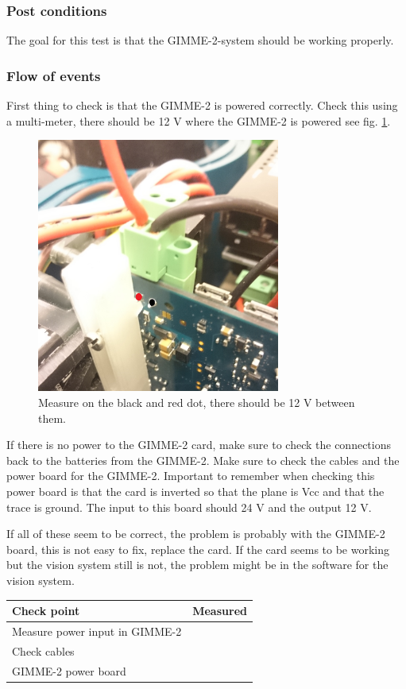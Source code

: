 \documentclass[10pt,a4paper]{article}
\begin{document}
\subsubsection*{Post conditions}
The goal for this test is that the GIMME-2-system should be working properly. 
\subsubsection*{Flow of events}
First thing to check is that the GIMME-2 is powered correctly. Check this using a multi-meter, there should be 12 V where the GIMME-2 is powered see fig. \ref{GimmePower}. 
\begin{figure}[!ht]
	\begin{center}
		\includegraphics[width=80mm]{Gimme-power.jpg}
		\caption{Measure on the black and red dot, there should be 12 V between them.}
		\label{GimmePower}
	\end{center}
\end{figure}
If there is no power to the GIMME-2 card, make sure to check the connections back to the batteries from the GIMME-2. Make sure to check the cables and the power board for the GIMME-2. Important to remember when checking this power board is that the card is inverted so that the plane is Vcc and that the trace is ground. The input to this board should 24 V and the output 12 V. 

If all of these seem to be correct, the problem is probably with the GIMME-2 board, this is not easy to fix, replace the card. If the card seems to be working but the vision system still is not, the problem might be in the software for the vision system. 

\begin{tabular}{| l | c |}
\hline
Check point & Measured \\ \hline
Measure power input in GIMME-2 & \\ \hline
Check cables & \\ \hline
GIMME-2 power board & \\ \hline
\end{tabular} 
\end{document}
